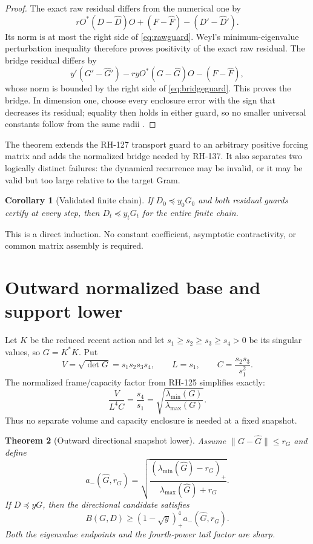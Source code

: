 \documentclass[12pt]{article}
\newtheorem{theorem}{Theorem}
\newtheorem{corollary}[theorem]{Corollary}
\begin{document}
\begin{proof}
The exact raw residual differs from the numerical one by
\[
 rO^*(D-\widehat D)O+(F-\widehat F)-(D'-\widehat D').
\]
Its norm is at most the right side of \eqref{eq:rawguard}.  Weyl's
minimum-eigenvalue perturbation inequality therefore proves positivity of
the exact raw residual.  The bridge residual differs by
\[
 y'(G'-\widehat G')-ryO^*(G-\widehat G)O-(F-\widehat F),
\]
whose norm is bounded by the right side of \eqref{eq:bridgeguard}.  This
proves the bridge.  In dimension one, choose every enclosure error with the
sign that decreases its residual; equality then holds in either guard, so
no smaller universal constants follow from the same radii
\citep{HornJohnson1991,Moore1966}.
\end{proof}

The theorem extends the RH-127 transport guard to an arbitrary positive
forcing matrix and adds the normalized bridge needed by RH-137.  It also
separates two logically distinct failures: the dynamical recurrence may be
invalid, or it may be valid but too large relative to the target Gram.

\begin{corollary}[Validated finite chain]\label{cor:chain}
If $D_0\preceq y_0G_0$ and both residual guards certify at every step, then
$D_t\preceq y_tG_t$ for the entire finite chain.
\end{corollary}

This is a direct induction.  No constant coefficient, asymptotic
contractivity, or common matrix assembly is required.

\section{Outward normalized base and support lower}
Let $K$ be the reduced recent action and let
$s_1\geq s_2\geq s_3\geq s_4>0$ be its singular values, so
$G=K^*K$.  Put
\[
 V=\sqrt{\det G}=s_1s_2s_3s_4,
 \qquad L=s_1,
 \qquad C=\frac{s_2s_3}{s_1^2}.
\]
The normalized frame/capacity factor from RH-125 simplifies exactly:
\begin{equation}\label{eq:baseidentity}
 \frac{V}{L^4C}=\frac{s_4}{s_1}
 =\sqrt{\frac{\lambda_{\min}(G)}{\lambda_{\max}(G)}}.
\end{equation}
Thus no separate volume and capacity enclosure is needed at a fixed
snapshot.

\begin{theorem}[Outward directional snapshot lower]\label{thm:support}
Assume $\|G-\widehat G\|\leq r_G$ and define
\[
 a_-(\widehat G,r_G)=
 \sqrt{\frac{(\lambda_{\min}(\widehat G)-r_G)_+}
 {\lambda_{\max}(\widehat G)+r_G}}.
\]
If $D\preceq yG$, then the directional candidate satisfies
\[
 B(G,D)\geq (1-\sqrt y)_+^4a_-(\widehat G,r_G).
\]
Both the eigenvalue endpoints and the fourth-power tail factor are sharp.
\end{theorem}
\end{document}
